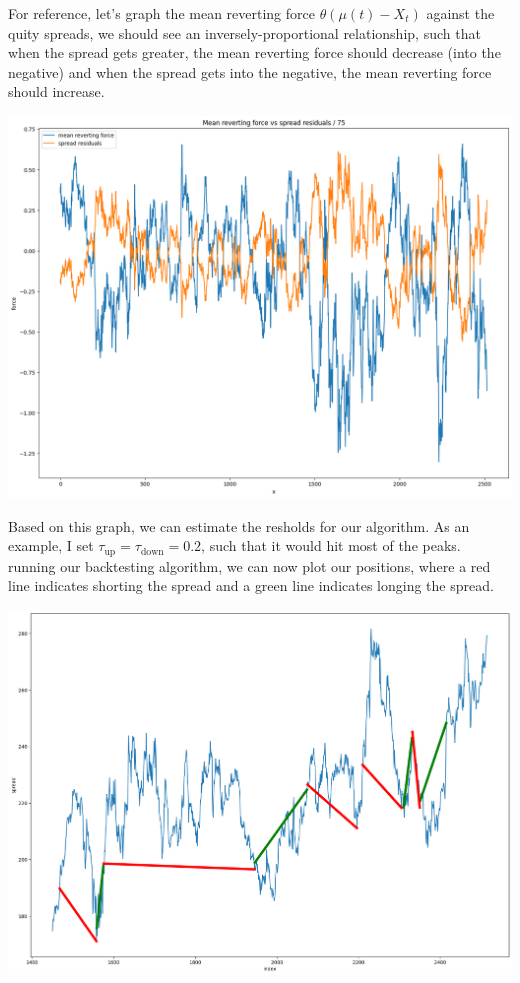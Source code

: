 \documentclass{article}
\begin{document}
\begin{spacing}{2.0}
For reference, let's graph the mean reverting force $\theta (\mu(t) - X_{t})$ against the quity spreads, we should see an inversely-proportional relationship, such that when the spread
gets greater, the mean reverting force should decrease (into the negative) and when the spread gets into the negative, the mean reverting force should increase.
\begin{center}
    \includegraphics[scale=0.32]{./images/mean_reverting_force.png}
\end{center}
Based on this graph, we can estimate the resholds for our algorithm. As an example, I set $\tau_{\text{up}} = \tau_{\text{down}} = 0.2$, such that it would hit most of the peaks. running
our backtesting algorithm, we can now plot our positions, where a red line indicates shorting the spread and a green line indicates longing the spread.
\begin{center}
    \includegraphics[scale=0.33]{./images/backtest_positions_1.png}

\end{center}
\end{spacing}
\end{document}

